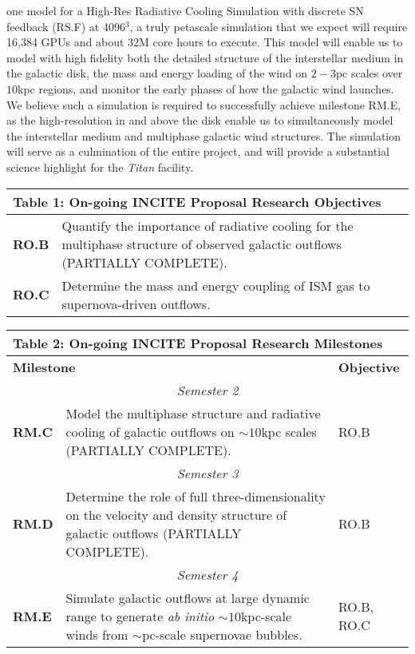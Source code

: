 \documentclass[11pt,letterpaper,english]{article}
\begin{document}
one model for a High-Res Radiative Cooling Simulation with discrete SN feedback (RS.F) at 4096$^3$, a truly petascale simulation
that we expect will require 16,384 GPUs and about 32M core hours to execute. This model will enable us to model with
high fidelity both the detailed structure of the interstellar medium in the galactic disk, the mass and energy loading
of the wind on $2-3$pc scales over $10$kpc regions, 
and monitor the early phases of how the galactic wind launches. We believe such a 
simulation is required to successfully achieve milestone RM.E, as the high-resolution in and above the disk enable
us to simultaneously model the interstellar medium and multiphase galactic wind structures. The simulation will serve
as a culmination of the entire project, and will provide a substantial science highlight for the \textit{Titan} facility.



\begin{table}[h]
\vspace{-.12in}
\begin{tabular}{|l|p{6.0in}|} 
\multicolumn{2}{l}{\bf{Table 1: On-going INCITE Proposal Research Objectives}}\\
\hline
\textbf{RO.B} & Quantify the importance of radiative cooling 
for the multiphase structure of observed galactic outflows (PARTIALLY COMPLETE).\\ \hline
\textbf{RO.C} & Determine the mass and energy coupling of ISM gas to supernova-driven outflows.\\
\hline
\end{tabular}
\end{table}


\begin{table}[h]
\vspace{-.12in}
\begin{tabular}{|l|p{5.0in}|l|} 
\multicolumn{3}{l}{\bf{Table 2: On-going INCITE Proposal Research Milestones}}\\
\hline
\multicolumn{2}{|l|}{\bf Milestone} & {\bf Objective} \\ \hline
\multicolumn{3}{|c|}{\it Semester 2} \\ \hline
\textbf{RM.C} & Model the multiphase structure and radiative cooling of galactic
outflows on $\sim10$kpc scales (PARTIALLY COMPLETE). & RO.B \\ \hline
\multicolumn{3}{|c|}{\it Semester 3} \\ \hline
\textbf{RM.D} & Determine the role of full three-dimensionality on the velocity and density
structure of galactic outflows (PARTIALLY COMPLETE). & RO.B\\ \hline
\multicolumn{3}{|c|}{\it Semester 4} \\ \hline
\textbf{RM.E} & Simulate galactic outflows at large dynamic range to generate {\it ab initio} $\sim10$kpc-scale winds from $\sim$pc-scale supernovae bubbles. & RO.B, RO.C\\ 
\hline
\end{tabular}
\end{table}
\end{document}
